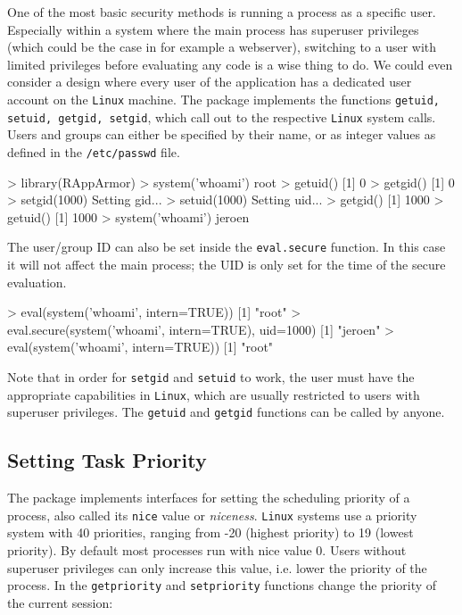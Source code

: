 \documentclass[article]{jss}
\newcommand{\RAppArmor}{\pkg{RAppArmor}\xspace}
\newcommand{\Linux}{\texttt{Linux}\xspace}
\begin{document}
One of the most basic security methods is running a process as a specific user.
Especially within a system where the main process has superuser privileges
(which could be the case in for example a webserver), switching to a user with
limited privileges before evaluating any code is a wise thing to do. We could
even consider a design where every user of the application has a dedicated
user account on the \Linux machine. The \RAppArmor package implements the
functions \texttt{getuid, setuid, getgid, setgid}, which call out to the
respective \Linux system calls. Users and groups can either be specified
by their name, or as integer values as defined in the \texttt{/etc/passwd} file.

\begin{CodeChunk}
\begin{CodeInput}
> library(RAppArmor)
> system('whoami')
root
> getuid()
[1] 0
> getgid()
[1] 0
> setgid(1000)
Setting gid...
> setuid(1000)
Setting uid...
> getgid()
[1] 1000
> getuid()
[1] 1000
> system('whoami')
jeroen
\end{CodeInput}
\end{CodeChunk}

The user/group ID can also be set inside the \texttt{eval.secure} function. In
this case it will not affect the main process; the UID is only set for the time
of the secure evaluation.

\begin{CodeChunk}
\begin{CodeInput}
> eval(system('whoami', intern=TRUE))
[1] "root"
> eval.secure(system('whoami', intern=TRUE), uid=1000)
[1] "jeroen"
> eval(system('whoami', intern=TRUE))
[1] "root"
\end{CodeInput}
\end{CodeChunk}

Note that in order for \texttt{setgid} and \texttt{setuid} to work, the user
must have the appropriate capabilities in \Linux, which are usually
restricted to users with superuser privileges. The \texttt{getuid} and
\texttt{getgid} functions can be called by anyone.

\subsection{Setting Task Priority}
\label{priority}

The \RAppArmor package implements interfaces for setting the scheduling priority
of a process, also called its \texttt{nice} value or \emph{niceness}. \Linux
systems use a priority system with 40 priorities, ranging from -20 (highest
priority) to 19 (lowest priority). By default most processes run with nice
value 0. Users without superuser privileges can only increase this value, i.e.
lower the priority of the process. In \RAppArmor the \texttt{getpriority} and
\texttt{setpriority} functions change the priority of the current session:
\end{document}
